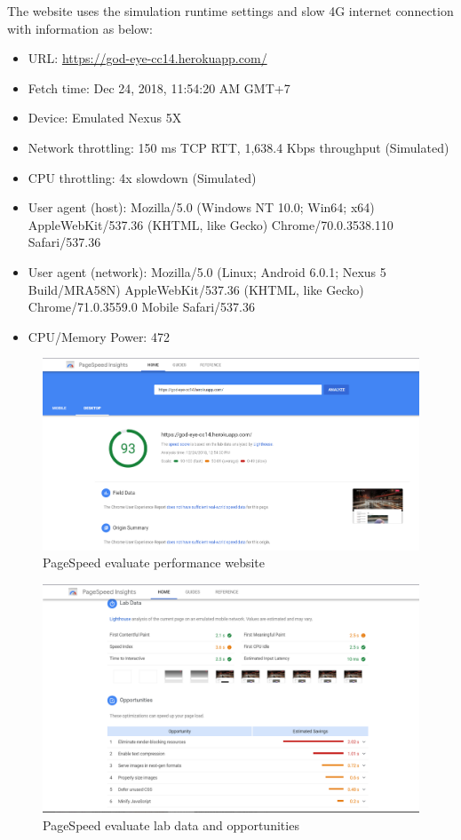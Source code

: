 The website uses the simulation runtime settings and slow 4G internet connection with information as below:
\begin{itemize}
	\item URL: \href{http://god-eye-cc14.herokuapp.com/}{https://god-eye-cc14.herokuapp.com/}
	\item Fetch time: Dec 24, 2018,  11:54:20 AM GMT+7
	\item Device: Emulated Nexus 5X
	\item Network throttling: 150 ms TCP RTT, 1,638.4 Kbps throughput (Simulated)
	\item CPU throttling: 4x slowdown (Simulated)
	\item User agent (host): Mozilla/5.0 (Windows NT 10.0; Win64; x64) AppleWebKit/537.36 (KHTML, like Gecko) Chrome/70.0.3538.110 Safari/537.36
	\item User agent (network): Mozilla/5.0 (Linux; Android 6.0.1; Nexus 5 Build/MRA58N) AppleWebKit/537.36 (KHTML, like Gecko) Chrome/71.0.3559.0 Mobile Safari/537.36
	\item CPU/Memory Power: 472
\end{itemize}
\begin{center}
	\begin{figure}[H]
		\centering
		\includegraphics[width=1\columnwidth]{images/chap5/pagespeed1.PNG}
		\caption{PageSpeed evaluate performance website}
	\end{figure}
\end{center}
\begin{center}
	\begin{figure}[H]
		\centering
		\includegraphics[width=1\columnwidth]{images/chap5/pagespeed2.PNG}
		\caption{PageSpeed evaluate lab data and opportunities}
	\end{figure}
\end{center}
